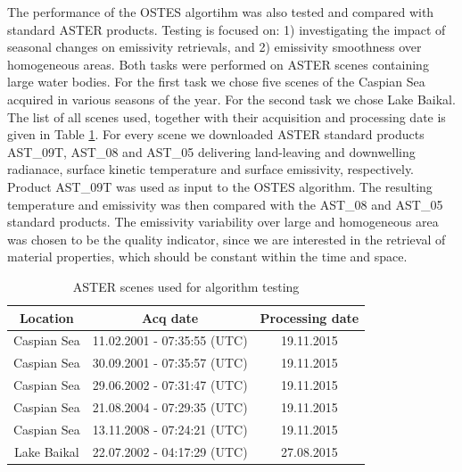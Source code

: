 The performance of the OSTES algortihm was also tested and compared with standard ASTER products. Testing is focused on: 1) investigating the impact of seasonal changes on emissivity retrievals, and 2) emissivity smoothness over homogeneous areas. Both tasks were performed on ASTER scenes containing large water bodies. For the first task we chose five scenes of the Caspian Sea acquired in various seasons of the year. For the second task we chose Lake Baikal. The list of all scenes used, together with their acquisition and processing date is given in Table \ref{table:ASTERScenes}. For every scene we downloaded ASTER standard products AST\_09T, AST\_08 and AST\_05 delivering land-leaving and downwelling radianace, surface kinetic temperature and surface emissivity, respectively. Product AST\_09T was used as input to the OSTES algorithm. The resulting temperature and emissivity was then compared with the AST\_08 and AST\_05 standard products. The emissivity variability over large and homogeneous area was chosen to be the quality indicator, since we are interested in the retrieval of material properties, which should be constant within the time and space.

\begin{table}[thb]
\vspace{0.5em}
\footnotesize
\centering
\begin{tabular}{ccc}
\toprule
Location & Acq date & Processing date \\ \hline
Caspian Sea & 11.02.2001 - 07:35:55 (UTC) & 19.11.2015 \\
Caspian Sea & 30.09.2001 - 07:35:57 (UTC) & 19.11.2015 \\
Caspian Sea & 29.06.2002 - 07:31:47 (UTC) & 19.11.2015 \\
Caspian Sea & 21.08.2004 - 07:29:35 (UTC) & 19.11.2015 \\
Caspian Sea & 13.11.2008 - 07:24:21 (UTC) & 19.11.2015 \\
Lake Baikal & 22.07.2002 - 04:17:29 (UTC) & 27.08.2015 \\
\bottomrule
\end{tabular}
\vspace{1.5 em}
\caption{ASTER scenes used for algorithm testing}
\label{table:ASTERScenes}
\normalsize
\end{table}

